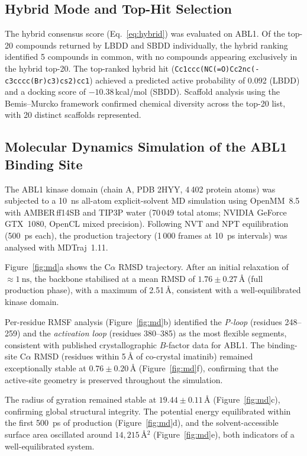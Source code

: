 \documentclass[journal=jcisd8,manuscript=article]{achemso}
\begin{document}
\subsection{Hybrid Mode and Top-Hit Selection}

The hybrid consensus score (Eq.~\ref{eq:hybrid}) was evaluated on ABL1.
Of the top-20 compounds returned by LBDD and SBDD individually, the hybrid
ranking identified 5 compounds in common, with no compounds appearing
exclusively in the hybrid top-20.  The top-ranked hybrid hit
(\texttt{Cc1ccc(NC(=O)Cc2nc(-c3cccc(Br)c3)cs2)cc1}) achieved a predicted
active probability of 0.092 (LBDD) and a docking score of
$-10.38$\,kcal/mol (SBDD).  Scaffold analysis using the Bemis--Murcko
framework\cite{bemis1996properties} confirmed chemical diversity across the
top-20 list, with 20 distinct scaffolds represented.

\subsection{Molecular Dynamics Simulation of the ABL1 Binding Site}

The ABL1 kinase domain (chain A, PDB 2HYY, 4\,402 protein atoms) was
subjected to a \SI{10}{\nano\second} all-atom explicit-solvent MD simulation
using OpenMM~8.5 with AMBER\,ff14SB and TIP3P water (70\,049 total atoms;
NVIDIA GeForce GTX~1080, OpenCL mixed precision).  Following NVT and NPT
equilibration (500~ps each), the production trajectory (1\,000 frames at
10~ps intervals) was analysed with MDTraj~1.11.

Figure~\ref{fig:md}a shows the C$\alpha$ RMSD trajectory.  After an initial
relaxation of $\approx \SI{1}{\nano\second}$, the backbone stabilised at a
mean RMSD of $1.76 \pm 0.27$\,\AA{} (full production phase), with a maximum
of 2.51\,\AA{}, consistent with a well-equilibrated kinase domain.

Per-residue RMSF analysis (Figure~\ref{fig:md}b) identified the
\textit{P-loop} (residues 248--259) and the \textit{activation loop}
(residues 380--385) as the most flexible segments, consistent with
published crystallographic $B$-factor data for ABL1.\cite{nagar2002structural}
The binding-site C$\alpha$ RMSD (residues within 5\,\AA{} of co-crystal
imatinib) remained exceptionally stable at $0.76 \pm 0.20$\,\AA{}
(Figure~\ref{fig:md}f), confirming that the active-site geometry is
preserved throughout the simulation.

The radius of gyration remained stable at $19.44 \pm 0.11$\,\AA{}
(Figure~\ref{fig:md}c), confirming global structural integrity.  The
potential energy equilibrated within the first \SI{500}{\pico\second} of
production (Figure~\ref{fig:md}d), and the solvent-accessible surface area
oscillated around $14{,}215$\,\AA{}$^2$ (Figure~\ref{fig:md}e), both
indicators of a well-equilibrated system.
\end{document}
